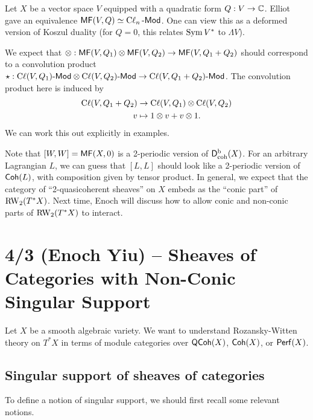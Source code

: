 \documentclass{article}
\begin{document}
\begin{ex}
	Let $X$ be a vector space $V$ equipped with a quadratic form $Q: V \to \mathbb{C}$.
	Elliot gave an equivalence $\mathsf{MF}(V, Q) \simeq \operatorname{C\ell}_n\text{-}\mathsf{Mod}$.
	One can view this as a deformed version of Koszul duality (for $Q = 0$, this relates $\operatorname{Sym} V^*$ to $\Lambda V$).
	
	We expect that $\otimes: \mathsf{MF}(V, Q_1) \otimes \mathsf{MF}(V, Q_2) \to \mathsf{MF}(V, Q_1 + Q_2)$ should correspond to a convolution product $\star: \operatorname{C\ell}(V, Q_1)\text{-}\mathsf{Mod} \otimes \operatorname{C\ell}(V, Q_2)\text{-}\mathsf{Mod} \to \operatorname{C\ell}(V, Q_1 + Q_2)\text{-}\mathsf{Mod}$.
	The convolution product here is induced by
	\begin{align*}
		\operatorname{C\ell}(V, Q_1 + Q_2) &\to \operatorname{C\ell}(V, Q_1) \otimes \operatorname{C\ell}(V, Q_2) \\
		v &\mapsto 1 \otimes v + v \otimes 1.
	\end{align*}
	We can work this out explicitly in examples.
\end{ex}

Note that $[W, W] = \mathsf{MF}(X, 0)$ is a 2-periodic version of $\mathsf{D}^\mathrm{b}_{\mathrm{coh}}(X)$.
For an arbitrary Lagrangian $L$, we can guess that $[L, L]$ should look like a 2-periodic version of $\mathsf{Coh}(L)$, with composition given by tensor product.
In general, we expect that the category of ``2-quasicoherent sheaves'' on $X$ embeds as the ``conic part'' of $\operatorname{RW}_2(T^* X)$.
Next time, Enoch will discuss how to allow conic and non-conic parts of $\operatorname{RW}_2(T^* X)$ to interact.

\section{4/3 (Enoch Yiu) -- Sheaves of Categories with Non-Conic Singular Support}

Let $X$ be a smooth algebraic variety.
We want to understand Rozansky-Witten theory on $T^* X$ in terms of module categories over $\mathsf{QCoh}(X)$, $\mathsf{Coh}(X)$, or $\mathsf{Perf}(X)$.

\subsection{Singular support of sheaves of categories}

To define a notion of singular support, we should first recall some relevant notions.
\end{document}

